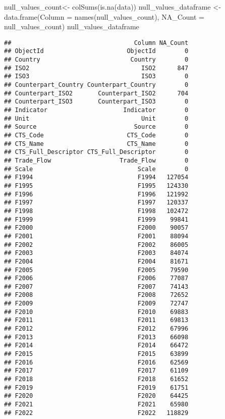 \documentclass[
]{article}
\newenvironment{Shaded}{\begin{snugshade}}{\end{snugshade}}
\newcommand{\AttributeTok}[1]{\textcolor[rgb]{0.77,0.63,0.00}{#1}}
\newcommand{\FunctionTok}[1]{\textcolor[rgb]{0.00,0.00,0.00}{#1}}
\newcommand{\NormalTok}[1]{#1}
\newcommand{\OtherTok}[1]{\textcolor[rgb]{0.56,0.35,0.01}{#1}}
\begin{document}
\begin{Shaded}
\begin{Highlighting}[]
\NormalTok{null\_values\_count}\OtherTok{\textless{}{-}} \FunctionTok{colSums}\NormalTok{(}\FunctionTok{is.na}\NormalTok{(data))}
\NormalTok{null\_values\_dataframe }\OtherTok{\textless{}{-}} \FunctionTok{data.frame}\NormalTok{(}\AttributeTok{Column =} \FunctionTok{names}\NormalTok{(null\_values\_count), }\AttributeTok{NA\_Count =}\NormalTok{ null\_values\_count)}
\NormalTok{null\_values\_dataframe}
\end{Highlighting}
\end{Shaded}

\begin{verbatim}
##                                  Column NA_Count
## ObjectId                       ObjectId        0
## Country                         Country        0
## ISO2                               ISO2      847
## ISO3                               ISO3        0
## Counterpart_Country Counterpart_Country        0
## Counterpart_ISO2       Counterpart_ISO2      704
## Counterpart_ISO3       Counterpart_ISO3        0
## Indicator                     Indicator        0
## Unit                               Unit        0
## Source                           Source        0
## CTS_Code                       CTS_Code        0
## CTS_Name                       CTS_Name        0
## CTS_Full_Descriptor CTS_Full_Descriptor        0
## Trade_Flow                   Trade_Flow        0
## Scale                             Scale        0
## F1994                             F1994   127054
## F1995                             F1995   124330
## F1996                             F1996   121992
## F1997                             F1997   120337
## F1998                             F1998   102472
## F1999                             F1999    99841
## F2000                             F2000    90057
## F2001                             F2001    88094
## F2002                             F2002    86005
## F2003                             F2003    84074
## F2004                             F2004    81671
## F2005                             F2005    79590
## F2006                             F2006    77087
## F2007                             F2007    74143
## F2008                             F2008    72652
## F2009                             F2009    72747
## F2010                             F2010    69883
## F2011                             F2011    69813
## F2012                             F2012    67996
## F2013                             F2013    66098
## F2014                             F2014    66472
## F2015                             F2015    63899
## F2016                             F2016    62569
## F2017                             F2017    61109
## F2018                             F2018    61652
## F2019                             F2019    61751
## F2020                             F2020    64425
## F2021                             F2021    65980
## F2022                             F2022   118829
\end{verbatim}
\end{document}
